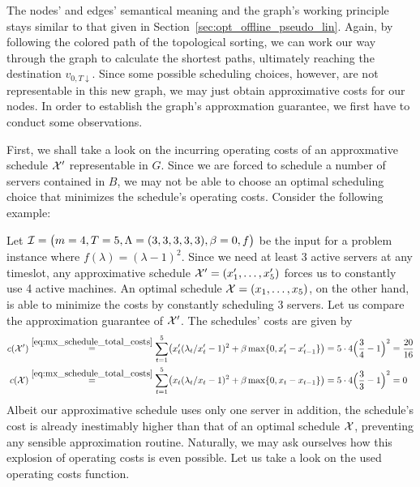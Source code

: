 The nodes' and edges' semantical meaning and the graph's working principle stays similar to that given in Section~\ref{sec:opt_offline_pseudo_lin}. Again, by following the colored path of the topological sorting, we can work our way through the graph to calculate the shortest paths, ultimately reaching the destination $v_{0,T\downarrow}$. Since some possible scheduling choices, however, are not representable in this new graph, we may just obtain approximative costs for our nodes. In order to establish the graph's approxmation guarantee, we first have to conduct some observations.

First, we shall take a look on the incurring operating costs of an approxmative schedule $\mathcal{X}'$ representable in $G$. Since we are forced to schedule a number of servers contained in $B$, we may not be able to choose an optimal scheduling choice that minimizes the schedule's operating costs. Consider the following example:
\begin{exmpl}
Let $\mathcal{I}=\bigl(m=4,T=5,\Lambda=(3,3,3,3,3),\beta=0,f\bigr)$ be the input for a problem instance where $f(\lambda)=(\lambda-1)^2$. Since we need at least 3 active servers at any timeslot, any approximative schedule $\mathcal{X}'=(x_1',\ldots,x_5')$ forces us to constantly use 4 active machines. An optimal schedule $\mathcal{X}=(x_1,\ldots,x_5)$, on the other hand, is able to minimize the costs by constantly scheduling 3 servers. Let us compare the approximation guarantee of $\mathcal{X}'$. The schedules' costs are given by
\begin{align*}
	c(\mathcal{X}')&\stackrel{\eqref{eq:mx_schedule_total_costs}}{=}\sum\limits_{t=1}^{5}\bigl(x_t'(\lambda_t/x_t'-1)^2+\beta\max\{0,x_t'-x_{t-1}'\}\bigr)=5\cdot4\Bigl(\frac{3}{4}-1\Bigr)^2=\frac{20}{16}\\
	c(\mathcal{X})&\stackrel{\eqref{eq:mx_schedule_total_costs}}{=}\sum\limits_{t=1}^{5}\bigl(x_t(\lambda_t/x_t-1)^2+\beta\max\{0,x_t-x_{t-1}\}\bigr)=5\cdot4\Bigl(\frac{3}{3}-1\Bigr)^2=0
\end{align*}
Albeit our approximative schedule uses only one server in addition, the schedule's cost is already inestimably higher than that of an optimal schedule $\mathcal{X}$, preventing any sensible approximation routine. Naturally, we may ask ourselves how this explosion of operating costs is even possible. Let us take a look on the used operating costs function.
\begin{figure}[H]
\end{figure}
\end{exmpl}

